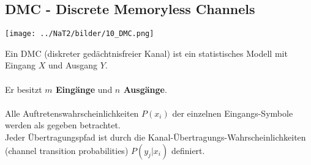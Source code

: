 \subsection{DMC - Discrete Memoryless Channels }
\begin{minipage}{9.5cm}
	\begin{center}
		\texttt{[image: ../NaT2/bilder/10\_DMC.png]}
	\end{center}
\end{minipage}
\begin{minipage}{8.5cm}
	Ein DMC (diskreter gedächtnisfreier Kanal) ist ein statistisches Modell mit Eingang $X$ und
	Ausgang $Y$. \\ \\
	Er besitzt \textbf{$m$ Eingänge} und \textbf{$n$ Ausgänge}. \\ \\
	Alle Auftretenswahrscheinlichkeiten $P(x_i)$ der einzelnen Eingangs-Symbole werden als gegeben
	betrachtet. \\
	Jeder Übertragungspfad ist durch die Kanal-Übertragungs-Wahrscheinlichkeiten (channel transition
	probabilities) $P(y_j | x_i)$ definiert.
\end{minipage}

